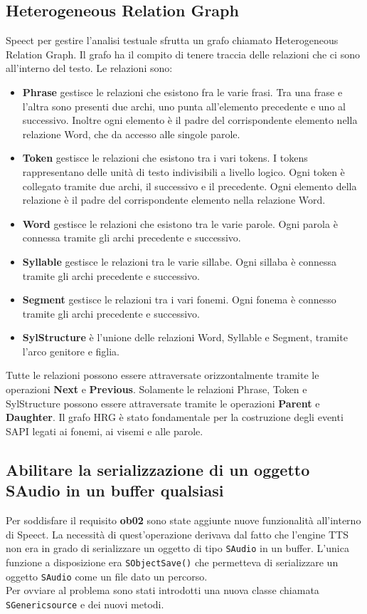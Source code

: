 \subsection{Heterogeneous Relation Graph}
Speect per gestire l'analisi testuale sfrutta un grafo chiamato Heterogeneous Relation Graph.
Il grafo ha il compito di tenere traccia delle relazioni che ci sono all'interno del testo.
Le relazioni sono:
\begin{itemize}
	\item \textbf{Phrase} gestisce le relazioni che esistono fra le varie frasi. Tra una frase e l'altra sono presenti due archi, uno punta all'elemento precedente e uno al successivo. Inoltre ogni elemento è il padre del corrispondente elemento nella relazione Word, che da accesso alle singole parole.   
	\item \textbf{Token} gestisce le relazioni che esistono tra i vari tokens. I tokens rappresentano delle unità di testo indivisibili a livello logico.
	Ogni token è collegato tramite due archi, il successivo e il precedente.
	Ogni elemento della relazione è il padre del corrispondente elemento nella relazione Word.
	\item \textbf{Word} gestisce le relazioni che esistono tra le varie parole. Ogni parola è connessa tramite gli archi precedente e successivo.
	\item \textbf{Syllable} gestisce le relazioni tra le varie sillabe. Ogni sillaba è connessa tramite gli archi precedente e successivo.
	\item \textbf{Segment} gestisce le relazioni tra i vari fonemi. Ogni fonema è connesso tramite gli archi precedente e successivo.
	\item \textbf{SylStructure} è l'unione delle relazioni Word, Syllable e Segment, tramite l'arco genitore e figlia.
\end{itemize}
Tutte le relazioni possono essere attraversate orizzontalmente tramite le operazioni \textbf{Next} e \textbf{Previous}.
Solamente le relazioni Phrase, Token e SylStructure possono essere attraversate tramite le operazioni \textbf{Parent} e \textbf{Daughter}.
Il grafo HRG è stato fondamentale per la costruzione degli eventi SAPI legati ai fonemi, ai visemi e alle parole.
\subsection{Abilitare la serializzazione di un oggetto SAudio in un buffer qualsiasi}
Per soddisfare il requisito \textbf{ob02} sono state aggiunte nuove funzionalità all'interno di Speect.
La necessità di quest'operazione derivava dal fatto che l'engine TTS non era in grado di serializzare un oggetto di tipo \texttt{SAudio} in un buffer.
L'unica funzione a disposizione era \texttt{SObjectSave()} che permetteva di serializzare un oggetto \texttt{SAudio} come un file dato un percorso.\\
Per ovviare al problema sono stati introdotti una nuova classe chiamata \texttt{SGenericsource} e dei nuovi metodi.
